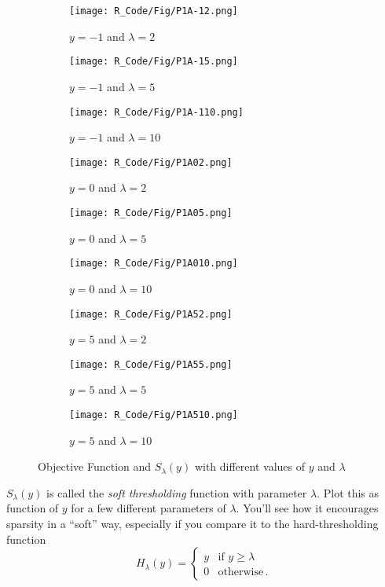 \documentclass[11 pt]{article}
\begin{document}
\begin{enumerate}[label=(\Alph*)]
\begin{figure}[H]
	\begin{center}
		\begin{subfigure}[h]{0.3\linewidth}
			\texttt{[image: R\_Code/Fig/P1A-12.png]}
			\caption{$y=-1$ and $\lambda=2$}
		\end{subfigure}
		\begin{subfigure}[h]{0.3\linewidth}
			\texttt{[image: R\_Code/Fig/P1A-15.png]}
			\caption{$y=-1$ and $\lambda=5$}
		\end{subfigure}
		\begin{subfigure}[h]{0.3\linewidth}
			\texttt{[image: R\_Code/Fig/P1A-110.png]}
			\caption{$y=-1$ and $\lambda=10$}
		\end{subfigure}
		\begin{subfigure}[h]{0.3\linewidth}
			\texttt{[image: R\_Code/Fig/P1A02.png]}
			\caption{$y=0$ and $\lambda=2$}
		\end{subfigure}
		\begin{subfigure}[h]{0.3\linewidth}
			\texttt{[image: R\_Code/Fig/P1A05.png]}
			\caption{$y=0$ and $\lambda=5$}
		\end{subfigure}
		\begin{subfigure}[h]{0.3\linewidth}
			\texttt{[image: R\_Code/Fig/P1A010.png]}
			\caption{$y=0$ and $\lambda=10$}
		\end{subfigure}
		\begin{subfigure}[h]{0.3\linewidth}
			\texttt{[image: R\_Code/Fig/P1A52.png]}
			\caption{$y=5$ and $\lambda=2$}
		\end{subfigure}
		\begin{subfigure}[h]{0.3\linewidth}
			\texttt{[image: R\_Code/Fig/P1A55.png]}
			\caption{$y=5$ and $\lambda=5$}
		\end{subfigure}
		\begin{subfigure}[h]{0.3\linewidth}
			\texttt{[image: R\_Code/Fig/P1A510.png]}
			\caption{$y=5$ and $\lambda=10$}
		\end{subfigure}
		\caption{Objective Function and $S_\lambda(y)$ with different values of $y$ and $\lambda$}
		\label{fig:Fig1}
	\end{center}
\end{figure}


\newpage

$S_\lambda(y)$ is called the \textit{soft thresholding} function with parameter $\lambda$.  Plot this as function of $y$ for a few different parameters of $\lambda$.  You'll see how it encourages sparsity in a ``soft'' way, especially if you compare it to the hard-thresholding function
$$
H_{\lambda}(y) = 
\left \{
\begin{array}{ll}
y & \mbox{if $y \geq \lambda$} \\
0 & \mbox{otherwise} \, .
\end{array}
\right.
$$


\end{enumerate}
\end{document}
